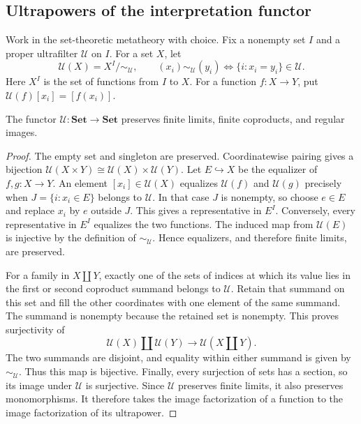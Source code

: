 \subsection{Ultrapowers of the interpretation functor}

Work in the set-theoretic metatheory with choice. Fix a
nonempty set $I$ and a proper ultrafilter $\mathcal U$ on $I$.
For a set $X$, let
\[
 \mathscr U(X)=X^I/{\sim_{\mathcal U}},
 \qquad
 (x_i)\sim_{\mathcal U}(y_i)
 \Longleftrightarrow\{i:x_i=y_i\}\in\mathcal U.
\]
Here $X^I$ is the set of functions from $I$ to $X$. For a
function $f:X\to Y$, put
$\mathscr U(f)[x_i]=[f(x_i)]$.

\begin{lemma}\label{lem:ultrapower-regular}
The functor $\mathscr U:\mathbf{Set}\to\mathbf{Set}$ preserves
finite limits, finite coproducts, and regular images.
\end{lemma}
\begin{proof}
The empty set and singleton are preserved. Coordinatewise pairing
gives a bijection
$\mathscr U(X\times Y)\cong\mathscr U(X)\times\mathscr U(Y)$.
Let $E\hookrightarrow X$ be the equalizer of $f,g:X\to Y$.
An element $[x_i]\in\mathscr U(X)$ equalizes
$\mathscr U(f)$ and $\mathscr U(g)$ precisely when
$J=\{i:x_i\in E\}$ belongs to $\mathcal U$. In that case
$J$ is nonempty, so choose $e\in E$ and replace $x_i$ by $e$
outside $J$. This gives a representative in $E^I$. Conversely,
every representative in $E^I$ equalizes the two functions.
The induced map from $\mathscr U(E)$ is injective by the
definition of $\sim_{\mathcal U}$. Hence equalizers, and
therefore finite limits, are preserved.

For a family in $X\amalg Y$, exactly one of the sets of indices
at which its value lies in the first or second coproduct summand
belongs to $\mathcal U$. Retain that summand on this set and
fill the other coordinates with one
element of the same summand. The summand is nonempty because
the retained set is nonempty. This proves surjectivity of
\[
 \mathscr U(X)\amalg\mathscr U(Y)
       \longrightarrow\mathscr U(X\amalg Y).
\]
The two summands are disjoint, and equality within either summand
is given by $\sim_{\mathcal U}$. Thus this
map is bijective. Finally, every surjection of sets has a section,
so its image under $\mathscr U$ is surjective. Since $\mathscr U$ preserves finite limits, it also preserves
monomorphisms. It therefore takes the image factorization of a function
to the image factorization of its ultrapower.
\end{proof}

